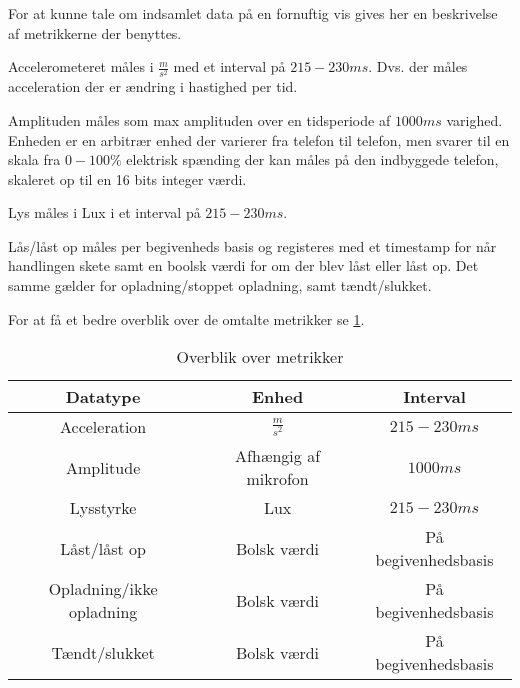 For at kunne tale om indsamlet data på en fornuftig vis gives her en beskrivelse af metrikkerne der benyttes.

Accelerometeret måles i $\frac{m}{s^2}$ med et interval på $215-230 ms$.
Dvs. der måles acceleration der er ændring i hastighed per tid.

Amplituden måles som max amplituden over en tidsperiode af $1000ms$ varighed.
Enheden er en arbitrær enhed der varierer fra telefon til telefon, men svarer til en skala fra $0-100\%$ elektrisk spænding der kan måles på den indbyggede telefon, skaleret op til en 16 bits integer værdi.

Lys måles i Lux i et interval på $215-230 ms$.

Lås/låst op måles per begivenheds basis og registeres med et timestamp for når handlingen skete samt en boolsk værdi for om der blev låst eller låst op.
Det samme gælder for opladning/stoppet opladning, samt tændt/slukket.

For at få et bedre overblik over de omtalte metrikker se \cref{tab:metrikker}.

\begin{table}[h]
\begin{tabular}{|c|c|c|}
	\hline Datatype & Enhed & Interval \\ 
	\hline Acceleration & $\frac{m}{s^2}$ & $215-230ms$ \\ 
	\hline Amplitude & Afhængig af mikrofon & $1000ms$ \\ 
	\hline Lysstyrke & Lux & $215-230ms$ \\ 
	\hline Låst/låst op & Bolsk værdi & På begivenhedsbasis \\ 
	\hline Opladning/ikke opladning & Bolsk værdi & På begivenhedsbasis \\ 
	\hline Tændt/slukket & Bolsk værdi & På begivenhedsbasis \\ 
	\hline 
\end{tabular}
\caption{Overblik over metrikker}\label{tab:metrikker} 
\end{table}